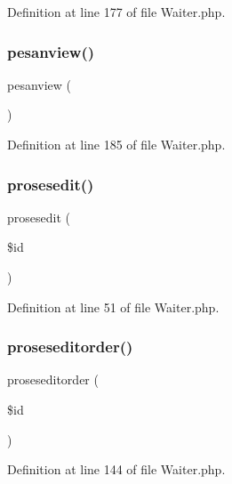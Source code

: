 Definition at line 177 of file Waiter.\+php.

\mbox{\label{class_waiter_a2184e0cd904ece2a3390ff342aedfeef}} 
\subsubsection{\texorpdfstring{pesanview()}{pesanview()}}
{\footnotesize\ttfamily pesanview (\begin{DoxyParamCaption}{ }\end{DoxyParamCaption})}



Definition at line 185 of file Waiter.\+php.

\mbox{\label{class_waiter_a580c41d234a611e73e56a65f5c5f3e48}} 
\subsubsection{\texorpdfstring{prosesedit()}{prosesedit()}}
{\footnotesize\ttfamily prosesedit (\begin{DoxyParamCaption}\item[{}]{\$id }\end{DoxyParamCaption})}



Definition at line 51 of file Waiter.\+php.

\mbox{\label{class_waiter_ac9ff26ebab745a6235e839fb72bb7ce1}} 
\subsubsection{\texorpdfstring{proseseditorder()}{proseseditorder()}}
{\footnotesize\ttfamily proseseditorder (\begin{DoxyParamCaption}\item[{}]{\$id }\end{DoxyParamCaption})}



Definition at line 144 of file Waiter.\+php.

\mbox{\label{class_waiter_a1b9dd472c16e5d04be01be8032bd7ffa}} 
